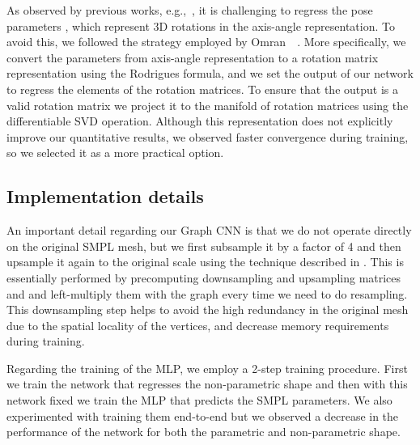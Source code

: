 As observed by previous works, e.g.,~\cite{pavlakos2018learning, martinez2017simple}, it is challenging to regress the pose parameters , which represent 3D rotations in the axis-angle representation. To avoid this, we followed the strategy employed by Omran~\etal~\cite{omran2018neural}. More specifically, we convert the parameters from axis-angle representation to a rotation matrix representation using the Rodrigues formula, and we set the output of our network to regress the elements of the rotation matrices. To ensure that the output is a valid rotation matrix we project it to the manifold of rotation matrices using the differentiable SVD operation. Although this representation does not explicitly improve our quantitative results, we observed faster convergence during training, so we selected it as a more practical option.

\subsection{Implementation details}\label{sec:details}

An important detail regarding our Graph CNN is that we do not operate directly on the original SMPL mesh, but we first subsample it by a factor of 4 and then upsample it again to the original scale using the technique described in \cite{ranjan2018generating}. This is essentially performed by precomputing downsampling and upsampling matrices  and  and left-multiply them with the graph every time we need to do resampling. This downsampling step helps to avoid the high redundancy in the original mesh due to the spatial locality of the vertices, and decrease memory requirements during training.

Regarding the training of the MLP, we employ a 2-step training procedure. First we train the network that regresses the non-parametric shape and then with this network fixed we train the MLP that predicts the SMPL parameters. We also experimented with training them end-to-end but we observed a decrease in the performance of the network for both the parametric and non-parametric shape. 